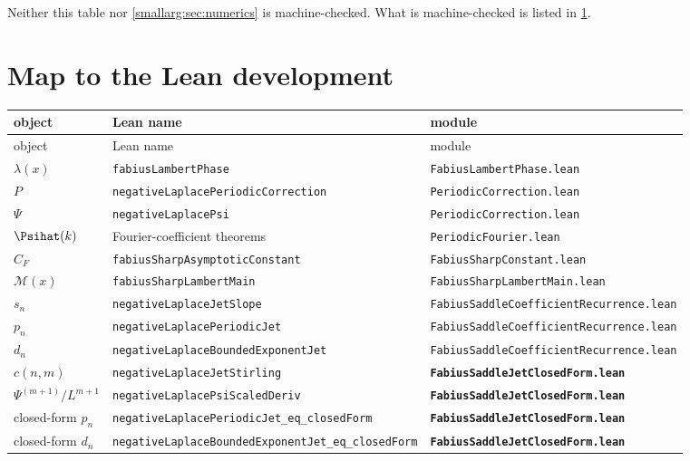 \documentclass[11pt,oneside]{article}
\theoremstyle{definition}
\theoremstyle{remark}
\begin{document}
Neither this table nor \cref{smallarg:sec:numerics} is machine-checked.  What is
machine-checked is listed in \cref{smallarg:sec:lean}.

\section{Map to the Lean development}\label{smallarg:sec:lean}

\begingroup\small
\begin{longtable}{@{}>{\raggedright\arraybackslash}p{}>{\raggedright\arraybackslash}p{}>{\raggedright\arraybackslash}p{}@{}}
\toprule
object & Lean name & module\\
\midrule
\endfirsthead
\toprule
object & Lean name & module\\
\midrule
\endhead
$\lambda(x)$ & \nolinkurl{fabiusLambertPhase} & \nolinkurl{FabiusLambertPhase.lean}\\
$P$ & \nolinkurl{negativeLaplacePeriodicCorrection} & \nolinkurl{PeriodicCorrection.lean}\\
$\Psi$ & \nolinkurl{negativeLaplacePsi} & \nolinkurl{PeriodicCorrection.lean}\\
$\Psihat(k)$ & Fourier-coefficient theorems & \nolinkurl{PeriodicFourier.lean}\\
$C_F$ & \nolinkurl{fabiusSharpAsymptoticConstant} & \nolinkurl{FabiusSharpConstant.lean}\\
$\mathcal M(x)$ & \nolinkurl{fabiusSharpLambertMain} & \nolinkurl{FabiusSharpLambertMain.lean}\\
$s_n$ & \nolinkurl{negativeLaplaceJetSlope} & \nolinkurl{FabiusSaddleCoefficientRecurrence.lean}\\
$p_n$ & \nolinkurl{negativeLaplacePeriodicJet} & \nolinkurl{FabiusSaddleCoefficientRecurrence.lean}\\
$d_n$ & \nolinkurl{negativeLaplaceBoundedExponentJet} & \nolinkurl{FabiusSaddleCoefficientRecurrence.lean}\\
$c(n,m)$ & \nolinkurl{negativeLaplaceJetStirling} & \textbf{\nolinkurl{FabiusSaddleJetClosedForm.lean}}\\
$\Psi^{(m+1)}/L^{m+1}$ & \nolinkurl{negativeLaplacePsiScaledDeriv} & \textbf{\nolinkurl{FabiusSaddleJetClosedForm.lean}}\\
closed-form $p_n$ & \nolinkurl{negativeLaplacePeriodicJet_eq_closedForm} & \textbf{\nolinkurl{FabiusSaddleJetClosedForm.lean}}\\
closed-form $d_n$ & \nolinkurl{negativeLaplaceBoundedExponentJet_eq_closedForm} & \textbf{\nolinkurl{FabiusSaddleJetClosedForm.lean}}\\

\end{longtable}
\end{document}
